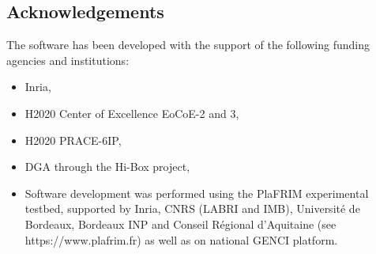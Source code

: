 \subsection{Acknowledgements}
\label{sec::Composyx:acknowledgements}

The software has been developed with the support of the following funding agencies and institutions: 
\begin{itemize}
  \item Inria,
  \item H2020 Center of Excellence EoCoE-2 and 3,
  \item H2020 PRACE-6IP,
  \item DGA through the Hi-Box project,
  \item Software development was performed using the PlaFRIM experimental testbed, supported by Inria, CNRS (LABRI and IMB), Université de Bordeaux, Bordeaux INP and Conseil R\'egional d’Aquitaine (see https://www.plafrim.fr) as well as on national GENCI platform. 
\end{itemize}





